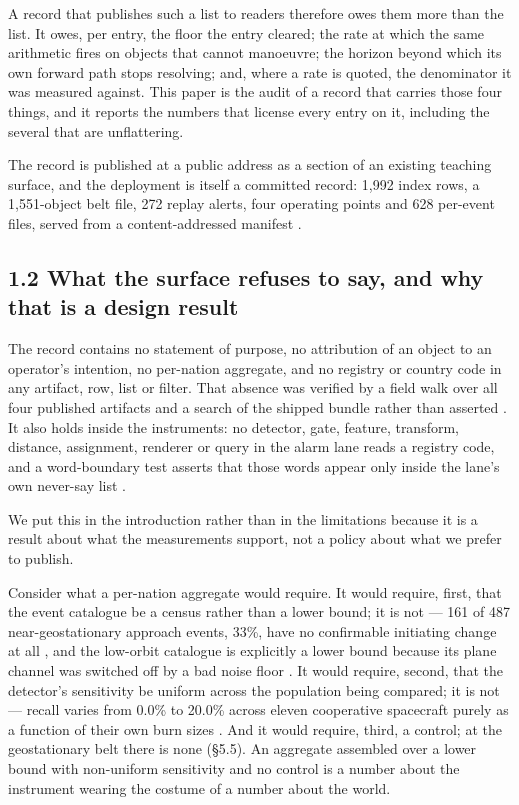 \documentclass[11pt]{article}
\begin{document}
A record that publishes such a list to readers therefore owes them more than the list. It owes, per entry, the floor the entry cleared; the rate at which the same arithmetic fires on objects that cannot manoeuvre; the horizon beyond which its own forward path stops resolving; and, where a rate is quoted, the denominator it was measured against. This paper is the audit of a record that carries those four things, and it reports the numbers that license every entry on it, including the several that are unflattering.

The record is published at a public address as a section of an existing teaching surface, and the deployment is itself a committed record: 1,992 index rows, a 1,551-object belt file, 272 replay alerts, four operating points and 628 per-event files, served from a content-addressed manifest%
.

\subsection*{1.2 What the surface refuses to say, and why that is a design result}

The record contains no statement of purpose, no attribution of an object to an operator's intention, no per-nation aggregate, and no registry or country code in any artifact, row, list or filter. That absence was verified by a field walk over all four published artifacts and a search of the shipped bundle rather than asserted%
. It also holds inside the instruments: no detector, gate, feature, transform, distance, assignment, renderer or query in the alarm lane reads a registry code, and a word-boundary test asserts that those words appear only inside the lane's own never-say list%
.

We put this in the introduction rather than in the limitations because it is a result about what the measurements support, not a policy about what we prefer to publish.

Consider what a per-nation aggregate would require. It would require, first, that the event catalogue be a census rather than a lower bound; it is not --- 161 of 487 near-geostationary approach events, 33\%, have no confirmable initiating change at all%
, and the low-orbit catalogue is explicitly a lower bound because its plane channel was switched off by a bad noise floor%
. It would require, second, that the detector's sensitivity be uniform across the population being compared; it is not --- recall varies from 0.0\% to 20.0\% across eleven cooperative spacecraft purely as a function of their own burn sizes%
. And it would require, third, a control; at the geostationary belt there is none (\S{}5.5). An aggregate assembled over a lower bound with non-uniform sensitivity and no control is a number about the instrument wearing the costume of a number about the world.
\end{document}

